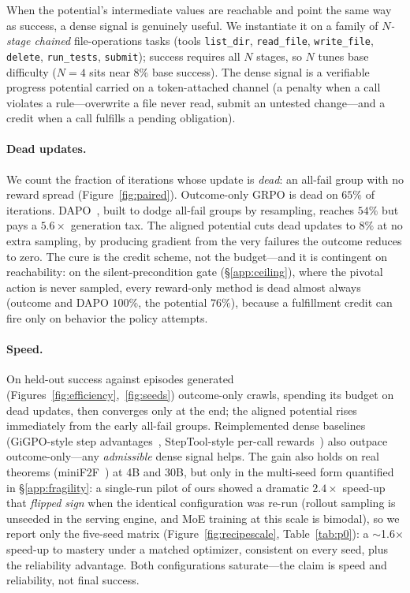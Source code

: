 When the potential's intermediate values are reachable and point the same way as success, a dense signal is genuinely useful. We instantiate it on a family of \emph{$N$-stage chained} file-operations tasks (tools \texttt{list\_dir}, \texttt{read\_file}, \texttt{write\_file}, \texttt{delete}, \texttt{run\_tests}, \texttt{submit}); success requires all $N$ stages, so $N$ tunes base difficulty ($N{=}4$ sits near $8\%$ base success). The dense signal is a verifiable progress potential carried on a token-attached channel (a penalty when a call violates a rule---overwrite a file never read, submit an untested change---and a credit when a call fulfills a pending obligation).

\paragraph{Dead updates.} We count the fraction of iterations whose update is \emph{dead}: an all-fail group with no reward spread (Figure~\ref{fig:paired}). Outcome-only GRPO is dead on $65\%$ of iterations. DAPO~\citep{dapo}, built to dodge all-fail groups by resampling, reaches $54\%$ but pays a $5.6\times$ generation tax. The aligned potential cuts dead updates to $8\%$ at no extra sampling, by producing gradient from the very failures the outcome reduces to zero. The cure is the credit scheme, not the budget---and it is contingent on reachability: on the silent-precondition gate (\S\ref{app:ceiling}), where the pivotal action is never sampled, every reward-only method is dead almost always (outcome and DAPO $100\%$, the potential $76\%$), because a fulfillment credit can fire only on behavior the policy attempts.

\paragraph{Speed.} On held-out success against episodes generated (Figures~\ref{fig:efficiency},~\ref{fig:seeds}) outcome-only crawls, spending its budget on dead updates, then converges only at the end; the aligned potential rises immediately from the early all-fail groups. Reimplemented dense baselines (GiGPO-style step advantages~\citep{gigpo}, StepTool-style per-call rewards~\citep{steptool}) also outpace outcome-only---any \emph{admissible} dense signal helps. The gain also holds on real theorems (miniF2F~\citep{minif2f}) at 4B and 30B, but only in the multi-seed form quantified in \S\ref{app:fragility}: a single-run pilot of ours showed a dramatic $2.4\times$ speed-up that \emph{flipped sign} when the identical configuration was re-run (rollout sampling is unseeded in the serving engine, and MoE training at this scale is bimodal), so we report only the five-seed matrix (Figure~\ref{fig:recipescale}, Table~\ref{tab:p0}): a $\sim$1.6$\times$ speed-up to mastery under a matched optimizer, consistent on every seed, plus the reliability advantage. Both configurations saturate---the claim is speed and reliability, not final success.

